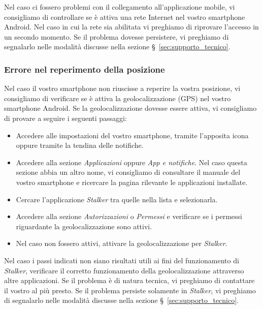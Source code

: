 \documentclass[../manuale-utente.tex]{subfiles}
\begin{document}
Nel caso ci fossero problemi con il collegamento all'applicazione mobile, vi consigliamo di controllare se è attiva una rete Internet nel vostro smartphone Android.
Nel caso in cui la rete sia abilitata vi preghiamo di riprovare l’accesso in un secondo momento.
Se il problema dovesse persistere, vi preghiamo di segnalarlo nelle modalità discusse nella sezione §~\ref{sec:supporto_tecnico}.

\subsubsection{Errore nel reperimento della posizione}%
\label{subs:mobile_app_errore_posizione}

Nel caso il vostro smartphone non riuscisse a reperire la vostra posizione, vi consigliamo di verificare se è attiva la geolocalizzazione (GPS) nel vostro smartphone Android.
Se la geolocalizzazione dovesse essere attiva, vi consigliamo di provare a seguire i seguenti passaggi:
\begin{itemize}
    \item Accedere alle impostazioni del vostro smartphone, tramite l'apposita icona oppure tramite la tendina delle notifiche.
    \item Accedere alla sezione \textit{Applicazioni} oppure \textit{App e notifiche}. Nel caso questa sezione abbia un altro nome, vi consigliamo di consultare il manuale del vostro smartphone e ricercare la pagina rilevante le applicazioni installate.
    \item Cercare l'applicazione \textit{Stalker} tra quelle nella lista e selezionarla.
    \item Accedere alla sezione \textit{Autorizzazioni} o \textit{Permessi} e verificare se i permessi riguardante la geolocalizzazione sono attivi.
    \item Nel caso non fossero attivi, attivare la geolocalizzazione per \textit{Stalker}.
\end{itemize}
Nel caso i passi indicati non siano risultati utili ai fini del funzionamento di \textit{Stalker}, verificare il corretto funzionamento della geolocalizzazione attraverso altre applicazioni.
Se il problema è di natura tecnica, vi preghiamo di contattare il vostro \textit{} al più presto.
Se il problema persiste solamente in \textit{Stalker}, vi preghiamo di segnalarlo nelle modalità discusse nella sezione §~\ref{sec:supporto_tecnico}.
\end{document}

